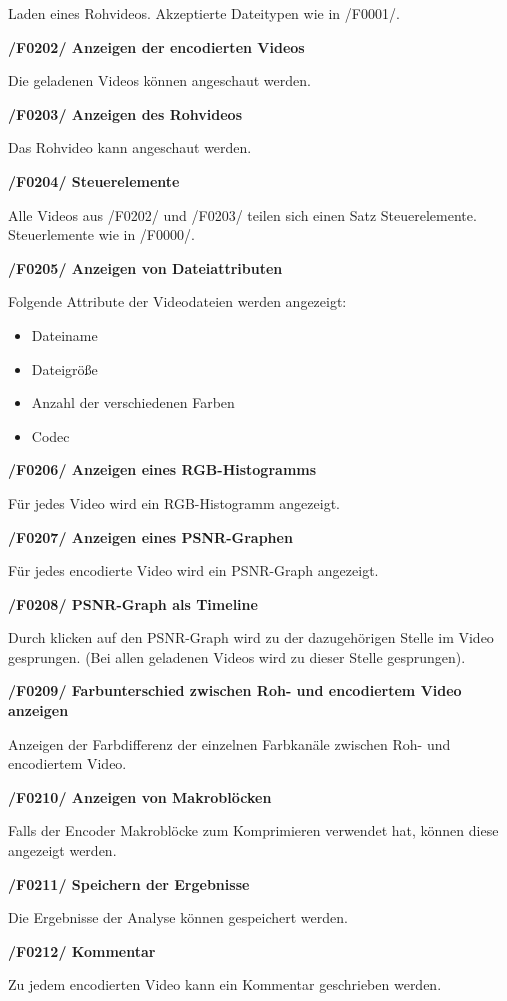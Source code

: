 \documentclass[parskip=full]{scrartcl}
\begin{document}
Laden eines Rohvideos. Akzeptierte Dateitypen wie in /F0001/.

\textbf{/F0202/ Anzeigen der encodierten Videos}

Die geladenen Videos können angeschaut werden.

\textbf{/F0203/ Anzeigen des Rohvideos}

Das Rohvideo kann angeschaut werden.

\textbf{/F0204/ Steuerelemente}

Alle Videos aus /F0202/ und /F0203/ teilen sich einen Satz Steuerelemente. Steuerlemente wie in /F0000/.

\textbf{/F0205/ Anzeigen von Dateiattributen}

Folgende Attribute der Videodateien werden angezeigt:
\begin{itemize}
\item Dateiname
\item Dateigröße
\item Anzahl der verschiedenen Farben
\item Codec
\end{itemize}

\textbf{/F0206/ Anzeigen eines RGB-Histogramms}

Für jedes Video wird ein RGB-Histogramm angezeigt.

\textbf{/F0207/ Anzeigen eines PSNR-Graphen}

Für jedes encodierte Video wird ein PSNR-Graph angezeigt.

\textbf{/F0208/ PSNR-Graph als Timeline}

Durch klicken auf den PSNR-Graph wird zu der dazugehörigen Stelle im Video gesprungen. (Bei allen geladenen Videos wird zu dieser Stelle gesprungen).

\textbf{/F0209/ Farbunterschied zwischen Roh- und encodiertem Video anzeigen}

Anzeigen der Farbdifferenz der einzelnen Farbkanäle zwischen Roh- und encodiertem Video.

\textbf{/F0210/ Anzeigen von Makroblöcken}

Falls der Encoder Makroblöcke zum Komprimieren verwendet hat, können diese angezeigt werden.

\textbf{/F0211/ Speichern der Ergebnisse}

Die Ergebnisse der Analyse können gespeichert werden.

\textbf{/F0212/ Kommentar}

Zu jedem encodierten Video kann ein Kommentar geschrieben werden.
\end{document}
